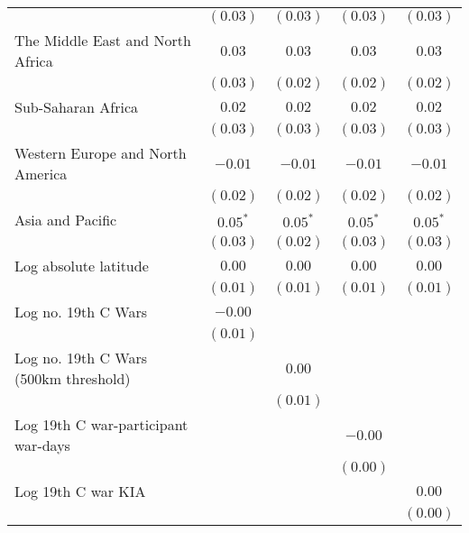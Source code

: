 \begin{table}[H]
\begin{center}
{\begin{tabular}{l c c c c}
                                      & $(0.03)$    & $(0.03)$    & $(0.03)$    & $(0.03)$    \\
The Middle East and North Africa      & $0.03$      & $0.03$      & $0.03$      & $0.03$      \\
                                      & $(0.03)$    & $(0.02)$    & $(0.02)$    & $(0.02)$    \\
Sub-Saharan Africa                    & $0.02$      & $0.02$      & $0.02$      & $0.02$      \\
                                      & $(0.03)$    & $(0.03)$    & $(0.03)$    & $(0.03)$    \\
Western Europe and North America      & $-0.01$     & $-0.01$     & $-0.01$     & $-0.01$     \\
                                      & $(0.02)$    & $(0.02)$    & $(0.02)$    & $(0.02)$    \\
Asia and Pacific                      & $0.05^{*}$  & $0.05^{*}$  & $0.05^{*}$  & $0.05^{*}$  \\
                                      & $(0.03)$    & $(0.02)$    & $(0.03)$    & $(0.03)$    \\
Log absolute latitude                 & $0.00$      & $0.00$      & $0.00$      & $0.00$      \\
                                      & $(0.01)$    & $(0.01)$    & $(0.01)$    & $(0.01)$    \\
Log no. 19th C Wars                   & $-0.00$     &             &             &             \\
                                      & $(0.01)$    &             &             &             \\
Log no. 19th C Wars (500km threshold) &             & $0.00$      &             &             \\
                                      &             & $(0.01)$    &             &             \\
Log 19th C war-participant war-days   &             &             & $-0.00$     &             \\
                                      &             &             & $(0.00)$    &             \\
Log 19th C war KIA                    &             &             &             & $0.00$      \\
                                      &             &             &             & $(0.00)$    \\

\end{tabular}}
\end{center}
\end{table}
